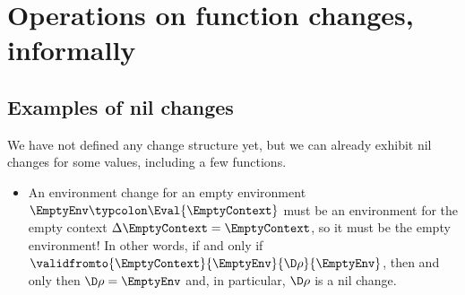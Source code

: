 \section{Operations on function changes, informally}
\label{sec:chs-funs-informal}
\subsection{Examples of nil changes}
\label{sec:nil-changes-intro}

We have not defined any change structure yet, but we can already exhibit nil
changes for some values, including a few functions.
\begin{examples}
  \begin{itemize}
  \item
An environment change for an empty environment \ensuremath{\EmptyEnv\typcolon\Eval{\EmptyContext}} must be an environment for the empty context
\ensuremath{\Delta \EmptyContext\mathrel{=}\EmptyContext}, so it must be the empty environment! In
other words, if and only if \ensuremath{\validfromto{\EmptyContext}{\EmptyEnv}{\D\rho}{\EmptyEnv}}, then and only then \ensuremath{\D\rho\mathrel{=}\EmptyEnv} and, in
particular, \ensuremath{\D\rho} is a nil change.


\end{itemize}
\end{examples}
